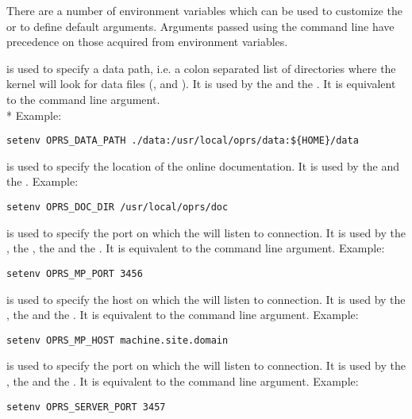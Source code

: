There are a number of environment variables which can be used to customize the
\XPK{} or to define default arguments. Arguments passed using the command line
have precedence on those acquired from environment variables.

\begin{description}

\item[\code{OPRS\_DATA\_PATH}] is used  to specify a data path, i.e. a colon separated
list of directories where the kernel will look for data files (,
 and ). It is used by the \CPK{} and the \XPK{}. It is
equivalent to the  command line argument.\\*
Example:
\begin{verbatim}
setenv OPRS_DATA_PATH ./data:/usr/local/oprs/data:${HOME}/data
\end{verbatim}

\item[\code{OPRS\_DOC\_DIR}] is used  to specify the location of the online \COPRSDE{}
documentation. It is used by the \XPK{} and the \OPE{}.
Example:
\begin{verbatim}
setenv OPRS_DOC_DIR /usr/local/oprs/doc
\end{verbatim}

\item[\code{OPRS\_MP\_PORT}] is used  to specify the port on which the \MPA{} will listen
to connection. It is used by the \CPK{}, the \XPK{}, the \OPRSS{} and the
\MPA{}. It is equivalent to the  command line argument.
Example:
\begin{verbatim}
setenv OPRS_MP_PORT 3456
\end{verbatim}

\item[\code{OPRS\_MP\_HOST}] is used  to specify the host on which the \MPA{} will
listen to connection. It is used by the \CPK{}, the \XPK{} and the
\OPRSS{}.  It is equivalent to the  command line argument.
Example:
\begin{verbatim}
setenv OPRS_MP_HOST machine.site.domain
\end{verbatim}

\item[\code{OPRS\_SERVER\_PORT}] is used  to specify the port on which the
\OPRSS{} will listen to connection. It is used by the \CPK{}, the \XPK{}
and the \OPRSS{}.  It is equivalent to the  command line argument.
Example:
\begin{verbatim}
setenv OPRS_SERVER_PORT 3457
\end{verbatim}


\end{description}
